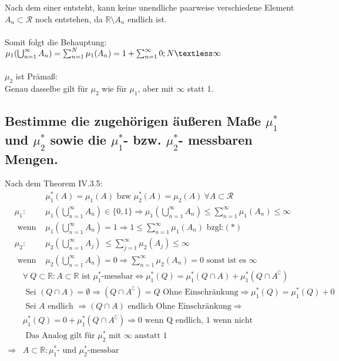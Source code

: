 \documentclass[12pt,a4paper]{article}
\begin{document}
Nach dem einer entsteht, kann keine  unendliche paarweise verschiedene Element $A_n \subset \mathscr{R}$ noch entstehen, da $\mathbb{R} \setminus A_n $ endlich ist.\\\\
 Somit folgt die Behauptung: $\mu_1( \bigcup_{n=1}^{\infty}A_n)  =  \sum_{n=1}^{N}\mu_1(A_n) = 1 + \sum_{n=1}^{\infty} 0; N \textless \infty $\\\\
$\mu_2$ ist Prämaß:\\
Genau dasselbe gilt für $\mu_2$ wie für $\mu_1$, aber mit $\infty$ statt 1.
\subsection{Bestimme die zugehörigen äußeren Maße $\mu_1^{*}$ und $\mu_2^{*}$ sowie die $\mu_1^{*}$- bzw. $\mu_2^{*}$-
messbaren Mengen.}
Nach dem Theorem IV.3.5: 
\begin{align*}
	&\mu_1^{*}(A)= \mu_1(A) \text{ bzw } \mu_2^{*}(A) = \mu_2(A)\ \forall A \subset \mathscr{R}\\
	\mu_1:&\mu_1(\bigcup_{n=1}^{\infty}A_n) \in \{0,1\} \Rightarrow\mu_1(\bigcup_{n=1}^{\infty}A_n) \leq \sum_{n=1}^{\infty}\mu_1(A_n) \leq \infty \\
	\text{ wenn }&\mu_1(\bigcup_{n=1}^{\infty}A_n) = 1 \Rightarrow 1 \leq \sum_{n=1}^{\infty}\mu_1(A_n)\text{ bzgl:}(*)\\
	\mu_2:&   \mu_2(\bigcup_{n=1}^{\infty}A_j) \ \leq \sum_{j=1}^{\infty}\mu_2(A_j) \leq\infty \\
	\text{ wenn }&\mu_2(\bigcup_{n=1}^{\infty}A_n) = 0 \Rightarrow \sum_{n=1}^{\infty}\mu_2(A_n) = 0 \text{ sonst ist es } \infty
\end{align*}
\begin{align*}
	&\forall \ Q \subset \mathbb{R} : A \subset \mathbb{R} \text { ist } \mu_1^{*} \text{-messbar}\iff \mu_1^{*}(Q) = \mu_1^{*}(Q \cap A) + \mu_1^{*}(Q \cap A^\complement)\\
	&\text{ Sei } (Q \cap A) = \emptyset \Rightarrow (Q \cap A^\complement ) = Q \text{ Ohne Einschränkung} \Rightarrow \mu_1^{*}(Q) = \mu_1^{*}(Q) + 0\\ \
	&\text{ Sei } A \text{ endlich } \Rightarrow  (Q \cap A) \text{ endlich Ohne Einschränkung} \Rightarrow \\ 
	&\mu_1^{*}(Q) = 0 +  \mu_1^{*}(Q \cap A^\complement) \Rightarrow 0 \text{ wenn Q endlich, } 1 \text{ wenn nicht}
	\\&\text{ Das Analog gilt für } \mu_2^{*} \text{ mit } \infty \text{ anstatt } 1 \\
	\Rightarrow & A \subset \mathbb{R}:  \mu_1^{*}\text{- und }  \mu_2^{*} \text{-messbar}
\end{align*}
\end{document}
